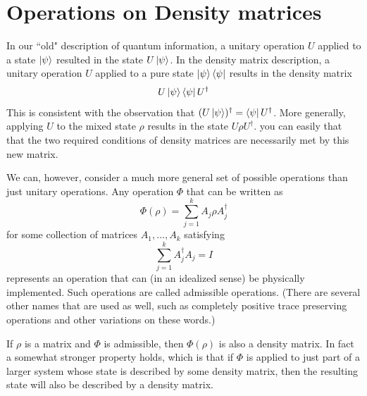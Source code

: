 \documentclass[12pt, oneside]{book}
\theoremstyle{definition}
\theoremstyle{definition}
\theoremstyle{remark}
\begin{document}
\section{Operations on Density matrices}
In our ``old" description of quantum information, a unitary operation $U$ applied to a state $\ket{\psi}$ resulted in the state $U\ket{\psi}$. In the density matrix description, a unitary operation $U$ applied to a pure state $\ket{\psi}\bra{\psi}$ results in the density matrix
\[
U\ket{\psi} \bra{\psi}U^{\dagger}
\]
This is consistent with the observation that $(U\ket{\psi})^{\dagger}=\bra{\psi}U^{\dagger}$. More generally, applying $U$ to the mixed state $\rho$ results in the state $U\rho U^{\dagger}$. you can easily that that the two required conditions of density matrices are necessarily met by this new matrix.

We can, however, consider a much more general set of possible operations than just unitary operations. Any operation $\Phi$ that can be written as
\[
\Phi(\rho)=\sum_{j=1}^k A_j\rho A_j^{\dagger}
\]
for some collection of matrices $A_1,\ldots,A_k$ satisfying
\[
\sum_{j=1}^k A_j^{\dagger}A_j = I
\]
represents an operation that can (in an idealized sense) be physically implemented. Such operations are called admissible operations. (There are several other names that are used as well, such as completely positive trace preserving operations and other variations on these words.)

If $\rho$ is a matrix and $\Phi$ is admissible, then $\Phi(\rho)$ is also a density matrix. In fact a somewhat stronger property holds, which is that if $\Phi$ is applied to just part of a larger system whose state is described by some density matrix, then the resulting state will also be described by a density matrix.
\end{document}
